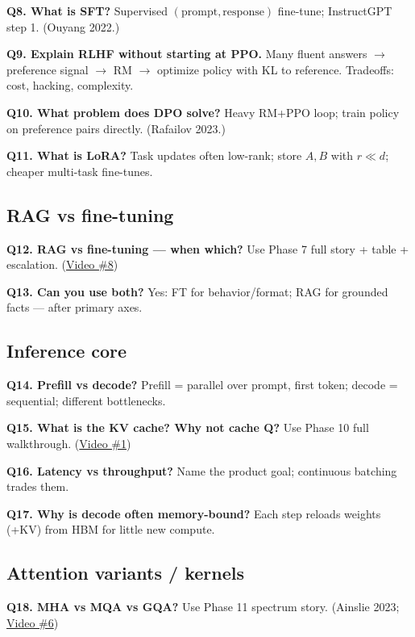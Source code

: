 \documentclass[11pt,a4paper]{article}
\begin{document}
{{\textbf{Q8. What is SFT?}   Supervised \((\mathrm{prompt},\mathrm{response})\) fine-tune; InstructGPT step 1. (Ouyang 2022.)


\textbf{Q9. Explain RLHF without starting at PPO.}   Many fluent answers $\rightarrow$ preference signal $\rightarrow$ RM $\rightarrow$ optimize policy with KL to reference. Tradeoffs: cost, hacking, complexity.


\textbf{Q10. What problem does DPO solve?}   Heavy RM+PPO loop; train policy on preference pairs directly. (Rafailov 2023.)


\textbf{Q11. What is LoRA?}   Task updates often low-rank; store \(A,B\) with \(r\ll d\); cheaper multi-task fine-tunes.


\subsection{RAG vs fine-tuning}


\textbf{Q12. RAG vs fine-tuning --- when which?}   Use Phase 7 full story + table + escalation. (\href{https://www.youtube.com/watch?v=cCXjumE70-g}{Video \#8})


\textbf{Q13. Can you use both?}   Yes: FT for behavior/format; RAG for grounded facts --- after primary axes.


\subsection{Inference core}


\textbf{Q14. Prefill vs decode?}   Prefill = parallel over prompt, first token; decode = sequential; different bottlenecks.


\textbf{Q15. What is the KV cache? Why not cache Q?}   Use Phase 10 full walkthrough. (\href{https://www.youtube.com/watch?v=CxRGWfcGVbs}{Video \#1})


\textbf{Q16. Latency vs throughput?}   Name the product goal; continuous batching trades them.


\textbf{Q17. Why is decode often memory-bound?}   Each step reloads weights (+KV) from HBM for little new compute.


\subsection{Attention variants / kernels}


\textbf{Q18. MHA vs MQA vs GQA?}   Use Phase 11 spectrum story. (Ainslie 2023; \href{https://www.youtube.com/watch?v=mtsY7JsGQjw}{Video \#6})


}}
\end{document}
